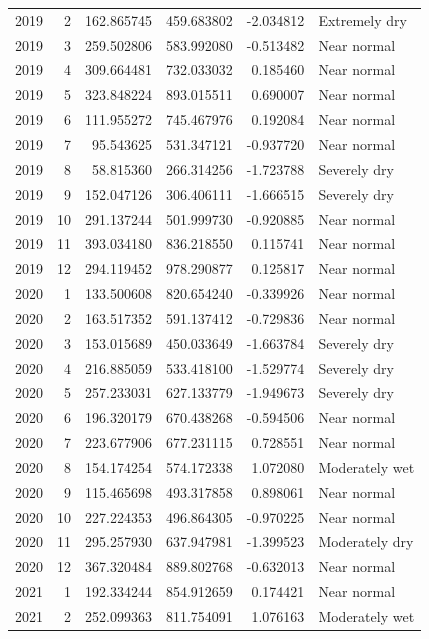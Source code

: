 \begin{tabular}{rrrrrl}
2019 & 2 & 162.865745 & 459.683802 & -2.034812 & Extremely dry \\
2019 & 3 & 259.502806 & 583.992080 & -0.513482 & Near normal \\
2019 & 4 & 309.664481 & 732.033032 & 0.185460 & Near normal \\
2019 & 5 & 323.848224 & 893.015511 & 0.690007 & Near normal \\
2019 & 6 & 111.955272 & 745.467976 & 0.192084 & Near normal \\
2019 & 7 & 95.543625 & 531.347121 & -0.937720 & Near normal \\
2019 & 8 & 58.815360 & 266.314256 & -1.723788 & Severely dry \\
2019 & 9 & 152.047126 & 306.406111 & -1.666515 & Severely dry \\
2019 & 10 & 291.137244 & 501.999730 & -0.920885 & Near normal \\
2019 & 11 & 393.034180 & 836.218550 & 0.115741 & Near normal \\
2019 & 12 & 294.119452 & 978.290877 & 0.125817 & Near normal \\
2020 & 1 & 133.500608 & 820.654240 & -0.339926 & Near normal \\
2020 & 2 & 163.517352 & 591.137412 & -0.729836 & Near normal \\
2020 & 3 & 153.015689 & 450.033649 & -1.663784 & Severely dry \\
2020 & 4 & 216.885059 & 533.418100 & -1.529774 & Severely dry \\
2020 & 5 & 257.233031 & 627.133779 & -1.949673 & Severely dry \\
2020 & 6 & 196.320179 & 670.438268 & -0.594506 & Near normal \\
2020 & 7 & 223.677906 & 677.231115 & 0.728551 & Near normal \\
2020 & 8 & 154.174254 & 574.172338 & 1.072080 & Moderately wet \\
2020 & 9 & 115.465698 & 493.317858 & 0.898061 & Near normal \\
2020 & 10 & 227.224353 & 496.864305 & -0.970225 & Near normal \\
2020 & 11 & 295.257930 & 637.947981 & -1.399523 & Moderately dry \\
2020 & 12 & 367.320484 & 889.802768 & -0.632013 & Near normal \\
2021 & 1 & 192.334244 & 854.912659 & 0.174421 & Near normal \\
2021 & 2 & 252.099363 & 811.754091 & 1.076163 & Moderately wet \\

\end{tabular}
